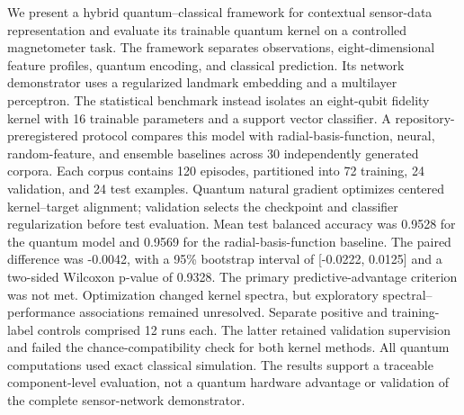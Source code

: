 We present a hybrid quantum--classical framework for contextual sensor-data representation and evaluate its trainable quantum kernel on a controlled magnetometer task. The framework separates observations, eight-dimensional feature profiles, quantum encoding, and classical prediction. Its network demonstrator uses a regularized landmark embedding and a multilayer perceptron. The statistical benchmark instead isolates an eight-qubit fidelity kernel with 16 trainable parameters and a support vector classifier. A repository-preregistered protocol compares this model with radial-basis-function, neural, random-feature, and ensemble baselines across 30 independently generated corpora. Each corpus contains 120 episodes, partitioned into 72 training, 24 validation, and 24 test examples. Quantum natural gradient optimizes centered kernel--target alignment; validation selects the checkpoint and classifier regularization before test evaluation. Mean test balanced accuracy was 0.9528 for the quantum model and 0.9569 for the radial-basis-function baseline. The paired difference was -0.0042, with a 95\% bootstrap interval of [-0.0222, 0.0125] and a two-sided Wilcoxon p-value of 0.9328. The primary predictive-advantage criterion was not met. Optimization changed kernel spectra, but exploratory spectral--performance associations remained unresolved. Separate positive and training-label controls comprised 12 runs each. The latter retained validation supervision and failed the chance-compatibility check for both kernel methods. All quantum computations used exact classical simulation. The results support a traceable component-level evaluation, not a quantum hardware advantage or validation of the complete sensor-network demonstrator.
